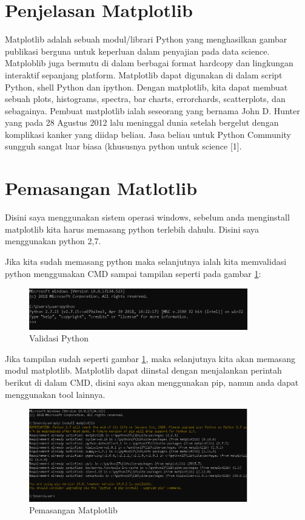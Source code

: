 \section{Penjelasan Matplotlib}
Matplotlib adalah sebuah modul/librari Python yang menghasilkan gambar publikasi berguna untuk keperluan dalam penyajian pada data science. Matploblib juga bermutu di dalam berbagai format hardcopy dan lingkungan interaktif sepanjang platform. Matplotlib dapat digunakan di dalam script Python, shell Python dan ipython. Dengan matplotlib, kita dapat membuat sebuah plots, histograms, spectra, bar charts, errorchards, scatterplots, dan sebagainya. Pembuat matplotlib ialah seseorang yang bernama John D. Hunter yang pada 28 Agustus 2012 lalu meninggal dunia setelah bergelut dengan komplikasi kanker yang diidap beliau. Jasa beliau untuk Python Community sungguh sangat luar biasa (khususnya python untuk science [1].
       
\section{Pemasangan Matlotlib}
Disini saya menggunakan sistem operasi windows, sebelum anda menginstall matplotlib kita harus memasang python terlebih dahulu. Disini saya menggunakan python 2,7.

Jika kita sudah memasang python maka selanjutnya ialah kita memvalidasi python menggunakan CMD sampai tampilan seperti pada gambar \ref{fig:cmd}: 
\begin{figure}[!htbp]
	\centerline{\includegraphics[width=0.85\textwidth]{figures/6/cmd.PNG}}
	\caption{Validasi Python}
	\label{fig:cmd}
\end{figure}

Jika tampilan sudah seperti gambar \ref{fig:cmd}, maka selanjutnya kita akan memasang modul matplotlib. Matplotlib dapat diinstal dengan menjalankan perintah berikut di dalam CMD, disini saya akan menggunakan pip, namun anda dapat menggunakan tool lainnya. 
\begin{figure}[!htbp]
	\centerline{\includegraphics[width=0.85\textwidth]{figures/6/pasangmpl.PNG}}
	\caption{Pemasangan Matplotlib}
	\label{fig:pasangmpl}
\end{figure}

